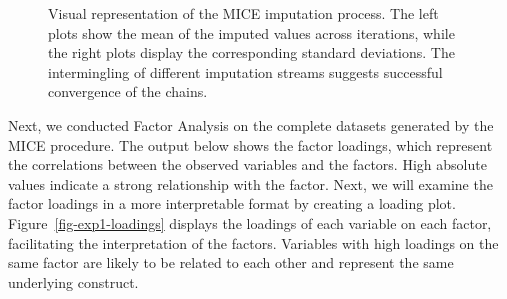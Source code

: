 \documentclass[
]{report}
\begin{document}
\begin{figure}
\begin{minipage}[t]{0.50\linewidth}
{{}

}

\subcaption{\label{fig-mice-10}}
\end{minipage}%
\newline
\begin{minipage}[t]{0.50\linewidth}

{\centering 


}

\subcaption{\label{fig-mice-11}}
\end{minipage}%
%
\begin{minipage}[t]{0.50\linewidth}

{\centering 


}

\subcaption{\label{fig-mice-12}}
\end{minipage}%
\newline
\begin{minipage}[t]{0.50\linewidth}

{\centering 


}

\subcaption{\label{fig-mice-13}}
\end{minipage}%

\caption{\label{fig-mice}Visual representation of the MICE imputation
process. The left plots show the mean of the imputed values across
iterations, while the right plots display the corresponding standard
deviations. The intermingling of different imputation streams suggests
successful convergence of the chains.}

\end{figure}

Next, we conducted Factor Analysis on the complete datasets generated by
the MICE procedure. The output below shows the factor loadings, which
represent the correlations between the observed variables and the
factors. High absolute values indicate a strong relationship with the
factor. Next, we will examine the factor loadings in a more
interpretable format by creating a loading plot.
Figure~\ref{fig-exp1-loadings} displays the loadings of each variable on
each factor, facilitating the interpretation of the factors. Variables
with high loadings on the same factor are likely to be related to each
other and represent the same underlying construct.
\end{document}
